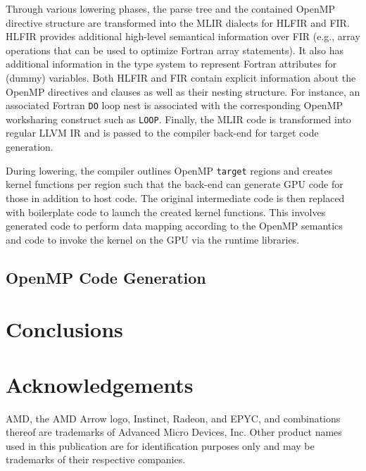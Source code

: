 \documentclass[acmtog,natbib=false]{acmart}
\newcommand{\code}[1]{\texttt{#1}\xspace}
\begin{document}
Through various lowering phases, the parse tree and the contained OpenMP directive structure are transformed into the \ac{MLIR} dialects for \ac{HLFIR} and \ac{FIR}.
\ac{HLFIR} provides additional high-level semantical information over \ac{FIR} (e.g., array operations that can be used to optimize Fortran array statements).
It also has additional information in the type system to represent Fortran attributes for (dummy) variables.
Both \ac{HLFIR} and \ac{FIR} contain explicit information about the OpenMP directives and clauses as well as their nesting structure.
For instance, an associated Fortran \code{DO} loop nest is associated with the corresponding OpenMP worksharing construct such as \code{LOOP}.
Finally, the \ac{MLIR} code is transformed into regular LLVM \ac{IR} and is passed to the compiler back-end for target code generation.

During lowering, the compiler outlines OpenMP \code{target} regions and creates kernel functions per region such that the back-end can generate \ac{GPU} code for those in addition to host code.
The original intermediate code is then replaced with boilerplate code to launch the created kernel functions.
This involves generated code to perform data mapping according to the OpenMP semantics and code to invoke the kernel on the GPU via the runtime libraries.

\subsection{OpenMP Code Generation}
\label{sec:OpenMPCodeGen}




\section{Conclusions}
\label{sec:Conclusions}



\section*{Acknowledgements}
AMD, the AMD Arrow logo, Instinct, Radeon, and EPYC, and combinations thereof are trademarks of Advanced Micro Devices, Inc.
Other product names used in this publication are for identification purposes only and may be trademarks of their respective companies.

\printbibliography
\end{document}
